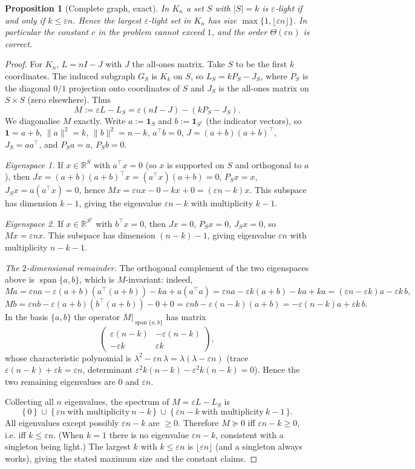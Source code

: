 \documentclass[12pt]{article}
\newtheorem{proposition}{Proposition}
\theoremstyle{definition}
\newcommand{\bR}{\mathbb{R}}
\newcommand{\eps}{\varepsilon}
\newcommand{\psd}{\succeq 0}
\begin{document}
\begin{proposition}[Complete graph, exact]\label{prop:Kn}
In $K_n$ a set $S$ with $|S|=k$ is $\eps$-light if and only if $k\le\eps n$. Hence the largest
$\eps$-light set in $K_n$ has size $\max\{1,\lfloor\eps n\rfloor\}$. In particular the constant $c$ in
the problem cannot exceed $1$, and the order $\Theta(\eps n)$ is correct.
\end{proposition}
\begin{proof}
For $K_n$, $L=nI-J$ with $J$ the all-ones matrix. Take $S$ to be the first $k$ coordinates. The
induced subgraph $G_S$ is $K_k$ on $S$, so $L_S=kP_S-J_S$, where $P_S$ is the diagonal $0/1$
projection onto coordinates of $S$ and $J_S$ is the all-ones matrix on $S\times S$ (zero elsewhere).
Thus
\[
M:=\eps L-L_S=\eps(nI-J)-(kP_S-J_S).
\]
We diagonalise $M$ exactly. Write $a:=\mathbf 1_S$ and $b:=\mathbf 1_{S^c}$ (the indicator vectors),
so $\mathbf 1=a+b$, $\|a\|^2=k$, $\|b\|^2=n-k$, $a^\top b=0$, $J=(a+b)(a+b)^\top$, $J_S=aa^\top$, and
$P_S a=a$, $P_S b=0$.

\emph{Eigenspace 1.} If $x\in\bR^S$ with $a^\top x=0$ (so $x$ is supported on $S$ and orthogonal to
$a$), then $Jx=(a+b)(a+b)^\top x=(a^\top x)(a+b)=0$, $P_S x=x$, $J_S x=a(a^\top x)=0$, hence
$Mx=\eps n x-0-kx+0=(\eps n-k)x$. This subspace has dimension $k-1$, giving the eigenvalue
$\eps n-k$ with multiplicity $k-1$.

\emph{Eigenspace 2.} If $x\in\bR^{S^c}$ with $b^\top x=0$, then $Jx=0$, $P_Sx=0$, $J_Sx=0$, so
$Mx=\eps n x$. This subspace has dimension $(n-k)-1$, giving eigenvalue $\eps n$ with multiplicity
$n-k-1$.

\emph{The $2$-dimensional remainder.} The orthogonal complement of the two eigenspaces above is
$\operatorname{span}\{a,b\}$, which is $M$-invariant: indeed,
\[
Ma=\eps n a-\eps(a+b)(a^\top(a+b))-ka+a(a^\top a)
=\eps n a-\eps k(a+b)-ka+ka=(\eps n-\eps k)a-\eps k\,b,
\]
\[
Mb=\eps n b-\eps(a+b)(b^\top(a+b))-0+0
=\eps n b-\eps(n-k)(a+b)=-\eps(n-k)a+\eps k\,b .
\]
In the basis $\{a,b\}$ the operator $M|_{\operatorname{span}\{a,b\}}$ has matrix
\[
\begin{pmatrix}\eps(n-k) & -\eps(n-k)\\[2pt] -\eps k & \eps k\end{pmatrix},
\]
whose characteristic polynomial is $\lambda^2-\eps n\,\lambda=\lambda(\lambda-\eps n)$ (trace
$\eps(n-k)+\eps k=\eps n$, determinant $\eps^2 k(n-k)-\eps^2 k(n-k)=0$). Hence the two remaining
eigenvalues are $0$ and $\eps n$.

Collecting all $n$ eigenvalues, the spectrum of $M=\eps L-L_S$ is
\[
\{\,0\,\}\ \cup\ \{\,\eps n\ \text{with multiplicity}\ n-k\,\}\ \cup\ \{\,\eps n-k\ \text{with
multiplicity}\ k-1\,\}.
\]
All eigenvalues except possibly $\eps n-k$ are $\ge0$. Therefore $M\psd$ iff $\eps n-k\ge0$, i.e. iff
$k\le\eps n$. (When $k=1$ there is no eigenvalue $\eps n-k$, consistent with a singleton being light.)
The largest $k$ with $k\le\eps n$ is $\lfloor\eps n\rfloor$ (and a singleton always works), giving the
stated maximum size and the constant claims.
\end{proof}
\end{document}

